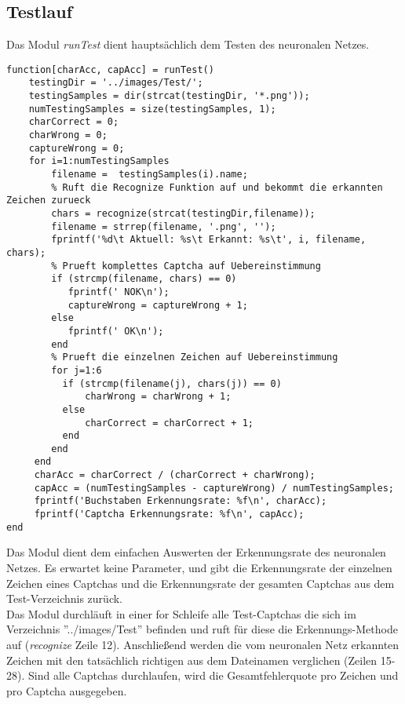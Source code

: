\subsection{Testlauf}
Das Modul \textit{runTest} dient hauptsächlich dem Testen des neuronalen Netzes. 
\begin{lstlisting}
function[charAcc, capAcc] = runTest()
    testingDir = '../images/Test/';    
    testingSamples = dir(strcat(testingDir, '*.png'));
    numTestingSamples = size(testingSamples, 1);
    charCorrect = 0;
    charWrong = 0;
    captureWrong = 0;
    for i=1:numTestingSamples
        filename =  testingSamples(i).name;
        % Ruft die Recognize Funktion auf und bekommt die erkannten Zeichen zurueck
        chars = recognize(strcat(testingDir,filename));
        filename = strrep(filename, '.png', '');
        fprintf('%d\t Aktuell: %s\t Erkannt: %s\t', i, filename, chars);
        % Prueft komplettes Captcha auf Uebereinstimmung
        if (strcmp(filename, chars) == 0)
           fprintf(' NOK\n');
           captureWrong = captureWrong + 1;
        else
           fprintf(' OK\n');
        end
        % Prueft die einzelnen Zeichen auf Uebereinstimmung
        for j=1:6
          if (strcmp(filename(j), chars(j)) == 0) 
              charWrong = charWrong + 1;
          else
              charCorrect = charCorrect + 1;
          end
        end   
     end
     charAcc = charCorrect / (charCorrect + charWrong);
     capAcc = (numTestingSamples - captureWrong) / numTestingSamples;
     fprintf('Buchstaben Erkennungsrate: %f\n', charAcc);
     fprintf('Captcha Erkennungsrate: %f\n', capAcc);
end
\end{lstlisting}
Das Modul dient dem einfachen Auswerten der Erkennungsrate des neuronalen Netzes. Es erwartet keine Parameter, und gibt die Erkennungsrate der einzelnen Zeichen eines Captchas und die Erkennungsrate der gesamten Captchas aus dem Test-Verzeichnis zurück.\\
Das Modul durchläuft in einer for Schleife alle Test-Captchas die sich im Verzeichnis ''../images/Test'' befinden und ruft für diese die Erkennungs-Methode auf (\textit{recognize} Zeile 12). Anschließend werden die vom neuronalen Netz erkannten Zeichen mit den tatsächlich richtigen aus dem Dateinamen verglichen (Zeilen 15-28). Sind alle Captchas durchlaufen, wird die Gesamtfehlerquote pro Zeichen und pro Captcha ausgegeben.
